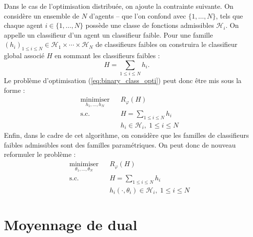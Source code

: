 \documentclass[a4paper]{article}
\begin{document}
Dans le cas de l'optimisation distribu\'ee, on ajoute la contrainte suivante. On considère
un ensemble de $N$ d'agents -- que l'on confond avec $\{1,\ldots,N\}$, tels que chaque
agent $i \in \{1,\ldots,N\}$ possède une classe de fonctions admissibles $\mathcal{H}_i$.
On appelle un classifieur d'un agent un classifieur faible.
Pour une famille $(h_i)_{1 \leq i \leq N} \in \mathcal{H}_1 \times \cdots \times \mathcal{H}_N$ de
classifieurs faibles on construira le classifieur global associ\'e $H$ en sommant les
classifieurs faibles :
\[
    H = \sum_{1 \leq i \leq N} h_i.
\]
Le problème d'optimisation (\ref{eq:binary_class_opti}) peut donc être mis sous la forme :
\[
\begin{aligned}
    & \underset{h_1,\ldots,h_N}{\text{minimiser}}
    & & R_{\varphi}(H) \\
    & \text{s.c.}
    & & H = \sum_{1 \leq i \leq N} h_i \\
    &&& h_i \in \mathcal{H}_i, \; 1 \leq i \leq N
\end{aligned}
\]
Enfin, dans le cadre de cet algorithme, on considère que les familles de classifieurs
faibles admissibles sont des familles param\'etriques. On peut donc de nouveau
reformuler le problème :
\[
\begin{aligned}
    & \underset{\theta_1,\ldots,\theta_N}{\text{minimiser}}
    & & R_{\varphi}(H) \\
    & \text{s.c.}
    & & H = \sum_{1 \leq i \leq N} h_i \\
    &&& h_i(\cdot, \theta_i) \in \mathcal{H}_i, \; 1 \leq i \leq N
\end{aligned}
\]

\section{Moyennage de dual}
\label{moyennage_de_dual}




\end{document}
